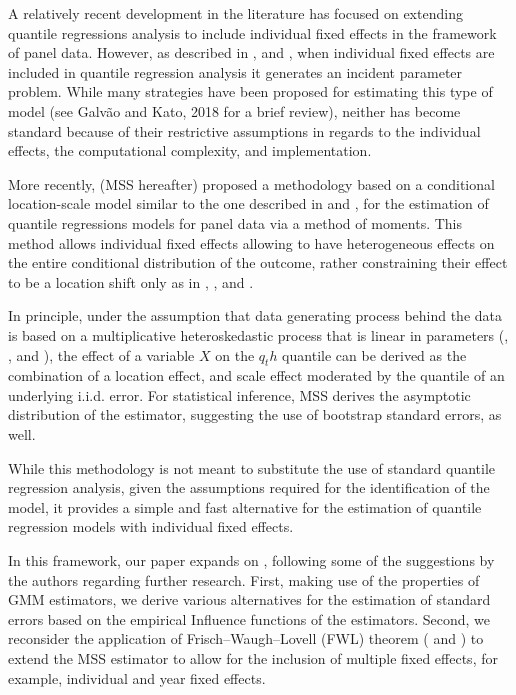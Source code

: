 \documentclass[
  authoryear,
  preprint,
  1p]{elsarticle}
\begin{document}
A relatively recent development in the literature has focused on
extending quantile regressions analysis to include individual fixed
effects in the framework of panel data. However, as described in
\citet{neymanscott1948}, and \citet{lancaster2000}, when individual
fixed effects are included in quantile regression analysis it generates
an incident parameter problem. While many strategies have been proposed
for estimating this type of model (see Galvão and Kato, 2018 for a brief
review), neither has become standard because of their restrictive
assumptions in regards to the individual effects, the computational
complexity, and implementation.

More recently, \citet{mss2019} (MSS hereafter) proposed a methodology
based on a conditional location-scale model similar to the one described
in \citet{he1997} and \citet{zhao2000}, for the estimation of quantile
regressions models for panel data via a method of moments. This method
allows individual fixed effects allowing to have heterogeneous effects
on the entire conditional distribution of the outcome, rather
constraining their effect to be a location shift only as in
\citet{canay2011}, \citet{koenker2004}, and \citet{lancaster2000}.

In principle, under the assumption that data generating process behind
the data is based on a multiplicative heteroskedastic process that is
linear in parameters (\citet{cameron2005}, \citet{mss2019},
\citet{he1997} and \citet{zhao2000} ), the effect of a variable \(X\) on
the \(q_th\) quantile can be derived as the combination of a location
effect, and scale effect moderated by the quantile of an underlying
i.i.d. error. For statistical inference, MSS derives the asymptotic
distribution of the estimator, suggesting the use of bootstrap standard
errors, as well.

While this methodology is not meant to substitute the use of standard
quantile regression analysis, given the assumptions required for the
identification of the model, it provides a simple and fast alternative
for the estimation of quantile regression models with individual fixed
effects.

In this framework, our paper expands on \citet{mss2019}, following some
of the suggestions by the authors regarding further research. First,
making use of the properties of GMM estimators, we derive various
alternatives for the estimation of standard errors based on the
empirical Influence functions of the estimators. Second, we reconsider
the application of Frisch--Waugh--Lovell (FWL) theorem
(\citet{frishwaugh1933} and \citet{lovell1963}) to extend the MSS
estimator to allow for the inclusion of multiple fixed effects, for
example, individual and year fixed effects.
\end{document}
